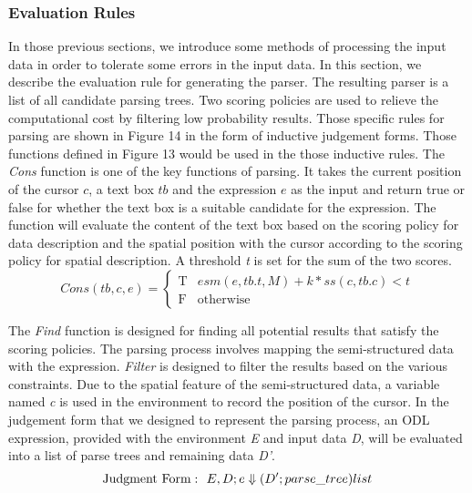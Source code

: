\subsubsection{Evaluation Rules}

In those previous sections, we introduce some methods of processing the input data in order to tolerate some errors in the input data. In this section, we describe the evaluation rule for generating the parser.
The resulting parser is a list of all candidate parsing trees. Two scoring
policies are used to relieve the computational cost by filtering low probability results. Those specific rules for parsing are shown in Figure 14 in the form of inductive judgement forms. Those functions defined in Figure 13 would be used in the those inductive rules.
The {\em Cons} function is one of the key functions of parsing. It takes
the current position of the cursor $c$, a text box $tb$ and the expression $e$ as the input
and return true or false for whether the text box is a suitable candidate for the
expression. The function will evaluate the content of the text box based on
the scoring policy for data description and the spatial position
with the cursor according to the scoring policy for spatial description.
A threshold {\em t} is set for the sum of the two scores.
\begin{equation}
Cons(tb, c, e) =
\begin{cases}
\text{T}& \text{$esm(e, tb.t, M)+k*ss(c, tb.c) < t$}\\
\text{F}& \text{otherwise}
\end{cases}
\label{equ:constraint}
\end{equation}

The {\em Find} function is
designed for finding all potential results that satisfy the scoring policies.
The parsing process involves mapping the semi-structured data with the expression.
{\em Filter} is designed to filter the results based on the various constraints.
Due to
the spatial feature of the semi-structured data,
a variable named {\em c} is used
in the environment to record the position of the cursor.
In the judgement form that we designed to represent the parsing process, an ODL
expression, provided with the environment {\em E} and input data {\em D}, will be
evaluated into a list of parse trees and remaining data {\em D'}.
\[
  {\rm Judgment~ Form:}~~ E,D;e \Downarrow (D';parse\_tree)list
  \label{semantics:judegement}
\]

